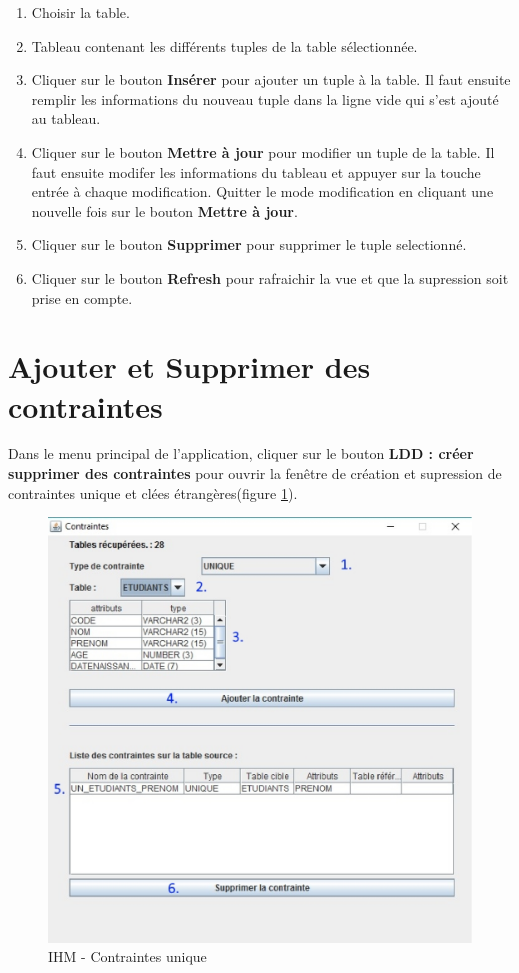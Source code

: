 \begin{enumerate}
\item Choisir la table.
\item Tableau contenant les différents tuples de la table sélectionnée.
\item Cliquer sur le bouton \textbf{Insérer} pour ajouter un tuple à la table. Il faut ensuite remplir les informations du nouveau tuple
dans la ligne vide qui s'est ajouté au tableau.
\item Cliquer sur le bouton \textbf{Mettre à jour} pour modifier un tuple de la table. Il faut ensuite modifer les informations du tableau et 
appuyer sur la touche entrée à chaque modification. Quitter le mode modification en cliquant une nouvelle fois sur le bouton \textbf{Mettre à jour}.
\item Cliquer sur le bouton \textbf{Supprimer} pour supprimer le tuple selectionné.
\item Cliquer sur le bouton \textbf{Refresh} pour rafraichir la vue et que la supression soit prise en compte.
\end{enumerate}

\section{Ajouter et Supprimer des contraintes}

Dans le menu principal de l'application, cliquer sur le bouton \textbf{LDD : créer supprimer des contraintes} pour ouvrir la fen\^etre de création et supression de contraintes unique et clées étrangères(figure \ref{contraintes_unique_gui}).

\begin{figure}[!h]
\centering
\includegraphics[width=12cm]{./images/manuel/contraintes_unique.eps}
\caption{IHM - Contraintes unique}
\label{contraintes_unique_gui}
\end{figure}

